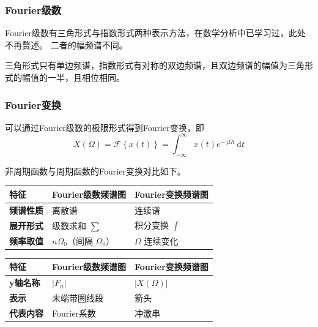 \documentclass[UTF8,fontset=fandol,zihao=5]{ctexart}
\newcommand{\jj}{\,\mathrm{j}}
\newcommand{\dd}{\,\mathrm{d}}
\newcommand{\FF}{\mathcal{F}}
\begin{document}
\subsubsection{Fourier级数}

Fourier级数有三角形式与指数形式两种表示方法，在数学分析中已学习过，此处不再赘述。
二者的幅频谱不同。

三角形式只有单边频谱，指数形式有对称的双边频谱，且双边频谱的幅值为三角形式的幅值的一半，且相位相同。

\subsubsection{Fourier变换}

可以通过Fourier级数的极限形式得到Fourier变换，即
\[
X(\varOmega) = \FF \left\{ x(t) \right\} = \int_{-\infty}^{\infty} x(t) e^{-\jj\varOmega t} \dd t
\]

非周期函数与周期函数的Fourier变换对比如下。

\begin{methodbox}[周期信号与非周期信号的Fourier变换比较]

  \begin{center}
  \begin{tabularx}{0.98\textwidth}{>{\bfseries}p{2.3cm}X X}
  \toprule
  特征 & Fourier级数频谱图 & Fourier变换频谱图 \\
  \midrule

  频谱性质
  & 离散谱
  & 连续谱 \\

  展开形式
  & 级数求和 $\displaystyle \sum$
  & 积分变换 $\displaystyle \int$ \\

  频率取值
  & $n\varOmega_0$（间隔 $\varOmega_0$）
  & $\varOmega$ 连续变化 \\

  \bottomrule
  \end{tabularx}
  \end{center}
\end{methodbox}

\begin{methodbox}
  \begin{center}
  \begin{tabularx}{0.98\textwidth}{>{\bfseries}p{2.3cm}X X}
  \toprule
  特征 & Fourier级数频谱图 & Fourier变换频谱图 \\
  \midrule

  y轴名称
  &
  $|F_n|$
  &
  $|X(\varOmega)|$
  \\


  表示
  &
  末端带圈线段
  &
  箭头
  \\

  代表内容
  &
  Fourier系数
  &
  冲激串
  \\

  \bottomrule
  \end{tabularx}
  \end{center}
\end{methodbox}
\end{document}
